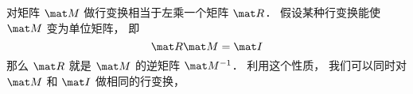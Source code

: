 
对矩阵 $\mat M$ 做行变换相当于左乘一个矩阵 $\mat R$． 假设某种行变换能使 $\mat M$ 变为单位矩阵， 即
\begin{equation}
\mat R \mat M = \mat I
\end{equation}
那么 $\mat R$ 就是 $\mat M$ 的逆矩阵 $\mat M^{-1}$． 利用这个性质， 我们可以同时对 $\mat M$ 和 $\mat I$ 做相同的行变换， 
